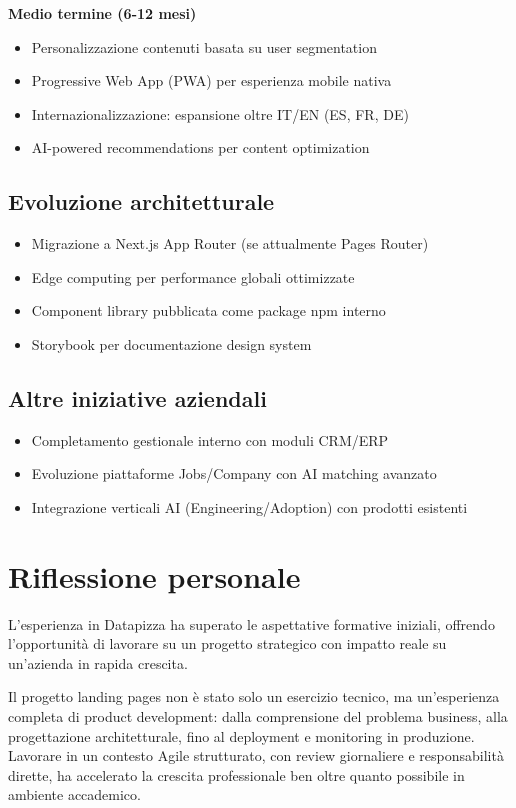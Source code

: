 \textbf{Medio termine (6-12 mesi)}
\begin{itemize}
  \item Personalizzazione contenuti basata su user segmentation
  \item Progressive Web App (PWA) per esperienza mobile nativa
  \item Internazionalizzazione: espansione oltre IT/EN (ES, FR, DE)
  \item AI-powered recommendations per content optimization
\end{itemize}

\subsection{Evoluzione architetturale}
\begin{itemize}
  \item Migrazione a Next.js App Router (se attualmente Pages Router)
  \item Edge computing per performance globali ottimizzate
  \item Component library pubblicata come package npm interno
  \item Storybook per documentazione design system
\end{itemize}

\subsection{Altre iniziative aziendali}
\begin{itemize}
  \item Completamento gestionale interno con moduli CRM/ERP
  \item Evoluzione piattaforme Jobs/Company con AI matching avanzato
  \item Integrazione verticali AI (Engineering/Adoption) con prodotti esistenti
\end{itemize}

\section{Riflessione personale}
L'esperienza in Datapizza ha superato le aspettative formative iniziali, offrendo l'opportunità di lavorare su un progetto strategico con impatto reale su un'azienda in rapida crescita. 

Il progetto landing pages non è stato solo un esercizio tecnico, ma un'esperienza completa di product development: dalla comprensione del problema business, alla progettazione architetturale, fino al deployment e monitoring in produzione. Lavorare in un contesto Agile strutturato, con review giornaliere e responsabilità dirette, ha accelerato la crescita professionale ben oltre quanto possibile in ambiente accademico.

